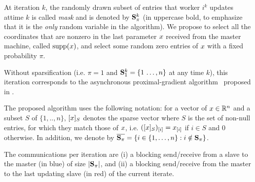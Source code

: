 At iteration $k$, the randomly drawn subset of entries that worker $i^k$ updates at\;time $k$ is called \emph{mask} and is denoted by $\mathbf{S}_{\pi}^k$ (in uppercase bold, to emphasize that it is the \emph{only} random variable in the algorithm). We propose to select all the coordinates that are nonzero in the last parameter $x$ received from the master machine, called $\mathrm{supp}({x})$, and select some random zero entries of $x$ with a fixed probability $\pi$.

Without sparsification (i.e. $\pi=1$ and \;$\mathbf{S}_1^{k}= \{1\,\ldots,n\}$ at any time $k$), this iteration corresponds to the asynchronous proximal-gradient algorithm \dave~proposed in \cite{ICML18}.


The proposed algorithm \SP{} uses the following notation:
for a vector of $x\in\mathbb{R}^n$ and a subset $S$ of $\{1,..,n\}$, $[x]_{S}$ denotes the sparse vector where $S$ is the set of non-null entries, for which they match those of $x$, i.e. $([x]_{S})_{[i]} = x_{[i]}$ if $i\in S$ and $0$ otherwise. In addition, we denote by $\overline{\mathbf{S}_{\pi}} = \{i\in\{1,\dots,n\}: i\notin \mathbf{S}_{\pi}\}$.

The communications per iteration are (i) a blocking {\color{blue!70!black}send/receive} from a slave to the master (in {\color{blue!70!black}blue}) of size $|\mathbf{S}_{\pi}|$, and (ii) a blocking {\color{red!80!yellow}send/receive} from the master to the last updating slave (in {\color{red!80!yellow}red}) of the current iterate.

